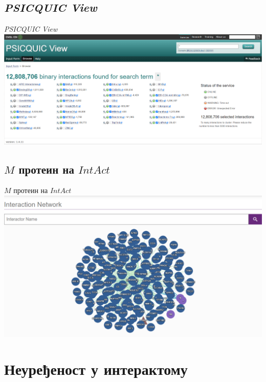 \documentclass[hyperref={bookmarks=false}]{beamer}
\begin{document}
\subsection{\textit{PSICQUIC View}}
\begin{frame}{\textit{PSICQUIC View}}
\centering\includegraphics[width=\textwidth]{PSICQUIC.png}
\end{frame}

\subsection{$M$ протеин на $IntAct$}
\begin{frame}{$M$ протеин на $IntAct$}
\centering\includegraphics[width=\textwidth]{IntAct.png}
\end{frame}

\section{Неуређеност у интерактому}
\end{document}
